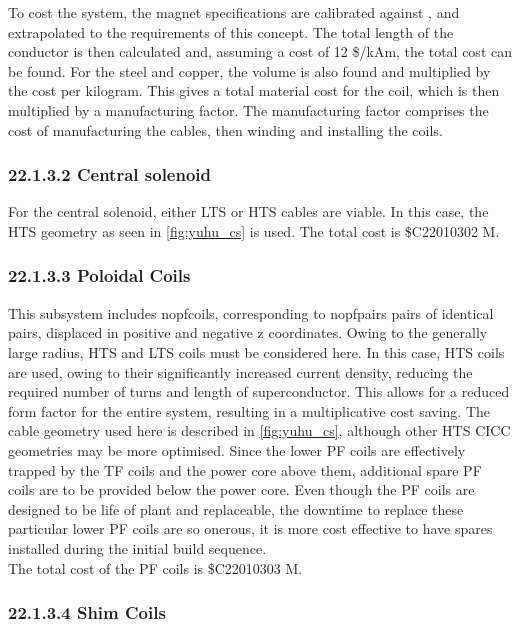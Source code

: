 To cost the system, the magnet specifications are calibrated against \cite{Menard2016}, and extrapolated to the requirements of this concept. The total length of the conductor is then calculated and, assuming a cost of 12 \$/kAm, the total cost can be found. For the steel and copper, the volume is also found and multiplied by the cost per kilogram. This gives a total material cost for the coil, which is then multiplied by a manufacturing factor. The manufacturing factor comprises the cost of manufacturing the cables, then winding and installing the coils. 

\subsubsection*{22.1.3.2 Central solenoid}

For the central solenoid, either LTS or HTS cables are viable. In this case, the HTS geometry as seen in \ref{fig:yuhu_cs} is used. The total cost is \$C22010302 M.

\subsubsection*{22.1.3.3 Poloidal Coils}

This subsystem includes nopfcoils, corresponding to nopfpairs pairs of identical pairs, displaced in positive and negative z coordinates. Owing to the generally large radius, HTS and LTS coils must be considered here. In this case, HTS coils are used, owing to their significantly increased current density, reducing the required number of turns and length of superconductor. This allows for a reduced form factor for the entire system, resulting in a multiplicative cost saving. The cable geometry used here is described in \ref{fig:yuhu_cs}, although other HTS CICC geometries may be more optimised.
Since the lower PF coils are effectively trapped by the TF coils and the power core above them, additional spare PF coils are to be provided below the power core. Even though the PF coils are designed to be life of plant and replaceable, the downtime to replace these particular lower PF coils are so onerous, it is more cost effective to have spares installed during the initial build sequence.  \\

The total cost of the PF coils is \$C22010303 M. 

\subsubsection*{22.1.3.4 Shim Coils}

